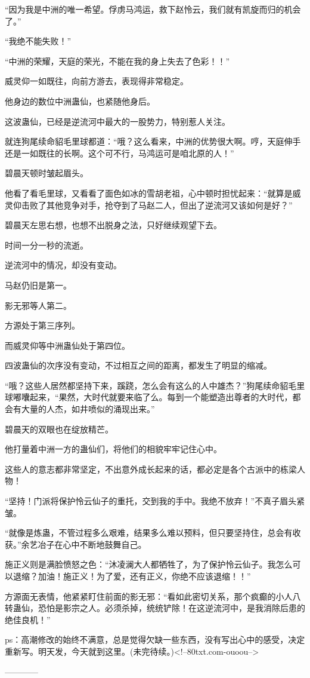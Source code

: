 \begin{this_body}
“因为我是中洲的唯一希望。俘虏马鸿运，救下赵怜云，我们就有凯旋而归的机会了。”

“我绝不能失败！”

“中洲的荣耀，天庭的荣光，不能在我的身上失去了色彩！！”

威灵仰一如既往，向前方游去，表现得非常稳定。

他身边的数位中洲蛊仙，也紧随他身后。

这波蛊仙，已经是逆流河中最大的一股势力，特别惹人关注。

就连狗尾续命貂毛里球都道：“哦？这么看来，中洲的优势很大啊。哼，天庭伸手还是一如既往的长啊。这个可不行，马鸿运可是咱北原的人！”

碧晨天顿时皱起眉头。

他看了看毛里球，又看看了面色如冰的雪胡老祖，心中顿时担忧起来：“就算是威灵仰击败了其他竞争对手，抢夺到了马赵二人，但出了逆流河又该如何是好？”

碧晨天左思右想，也想不出脱身之法，只好继续观望下去。

时间一分一秒的流逝。

逆流河中的情况，却没有变动。

马赵仍旧是第一。

影无邪等人第二。

方源处于第三序列。

而威灵仰等中洲蛊仙处于第四位。

四波蛊仙的次序没有变动，不过相互之间的距离，都发生了明显的缩减。

“哦？这些人居然都坚持下来，蹊跷，怎么会有这么的人中雄杰？”狗尾续命貂毛里球嘟囔起来，“果然，大时代就要来临了么。每到一个能塑造出尊者的大时代，都会有大量的人杰，如井喷似的涌现出来。”

碧晨天的双眼也在绽放精芒。

他打量着中洲一方的蛊仙们，将他们的相貌牢牢记住心中。

这些人的意志都非常坚定，不出意外成长起来的话，都必定是各个古派中的栋梁人物！

“坚持！门派将保护怜云仙子的重托，交到我的手中。我绝不放弃！”不真子眉头紧皱。

“就像是炼蛊，不管过程多么艰难，结果多么难以预料，但只要坚持住，总会有收获。”余艺冶子在心中不断地鼓舞自己。

施正义则是满脸愤怒之色：“沐凌澜大人都牺牲了，为了保护怜云仙子。我怎么可以退缩？加油！施正义！为了爱，还有正义，你绝不应该退缩！！”

方源面无表情，他紧紧盯住前面的影无邪：“看如此密切关系，那个疯癫的小人八转蛊仙，恐怕是影宗之人。必须杀掉，统统铲除！在这逆流河中，是我消除后患的绝佳良机！”

ps：高潮修改的始终不满意，总是觉得欠缺一些东西，没有写出心中的感受，决定重新写。明天发，今天就到这里。(未完待续。)<!--80txt.com-ouoou-->

------------

\end{this_body}

